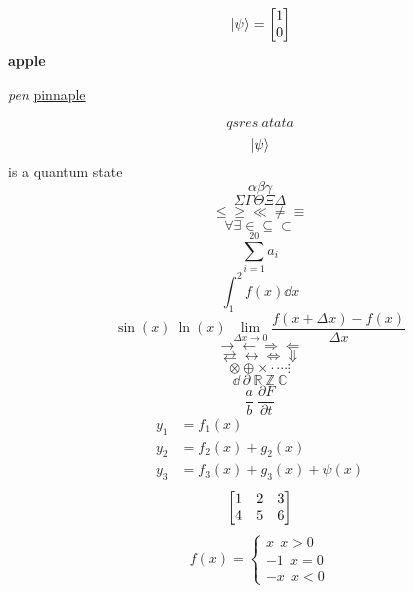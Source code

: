 \documentclass[UTF8,a4paper,15pt,titlepage,scale=0.8]{article}
\begin{document}
    
\tableofcontents
\begin{equation}
    \ket*{\psi} = \mqty[1\\ 0]
\end{equation}
\textbf{apple}

\textit{pen} \underline{pinnaple}

\begin{equation}
    qsres \  atata
\end{equation}
$$\ket{\psi}$$ is a quantum state
\begin{equation}
    \alpha  \beta \gamma
\end{equation}
\begin{equation}
    \Sigma \Gamma \Theta \Xi \Delta 
\end{equation}
\begin{equation}
    \le \ge \ll \neq \equiv 
\end{equation}
\begin{equation}
    \forall \exists \in \subseteq \subset 
\end{equation}
\begin{equation}
    \sum_{i=1}^{20} a_i
\end{equation}
\begin{equation}
    \int_1 ^2 f(x) \dd x
\end{equation}
\begin{equation}
    \sin (x) \ \ln(x) \ \lim_{\Delta x\rightarrow 0} \frac{f(x+\Delta x) - f(x)}{\Delta x }
\end{equation}
\begin{equation}
    \rightarrow \leftarrow \Rightarrow \Leftarrow
\end{equation}
\begin{equation}
    \rightleftarrows \leftrightarrow \Leftrightarrow \Downarrow 
\end{equation}
\begin{equation}
    \otimes \oplus \times \cdot \cdots \vdots 
\end{equation}
\begin{equation}
    \dd \ \partial \ \mathbb{R} \ \mathbb{Z} \ \mathbb{C}
\end{equation}
\begin{equation}
    \frac{a}{b} \ \frac{\partial F}{\partial t}
\end{equation}
\begin{equation}
    \begin{aligned}
        y_1 &= f_1(x)\\
        y_2 &= f_2(x) + g_2(x)\\
        y_3 &= f_3(x) + g_3(x) + \psi(x)
    \end{aligned}
\end{equation}
\begin{equation}
    \mqty[1&2&3 \\ 4&5&6]
\end{equation}
\begin{equation}
    f(x) = 
    \begin{cases}
        x  \ \ x>0 \\
        -1 \ \ x=0\\
        -x  \ \ x<0
    \end{cases}
\end{equation}
\end{document}
